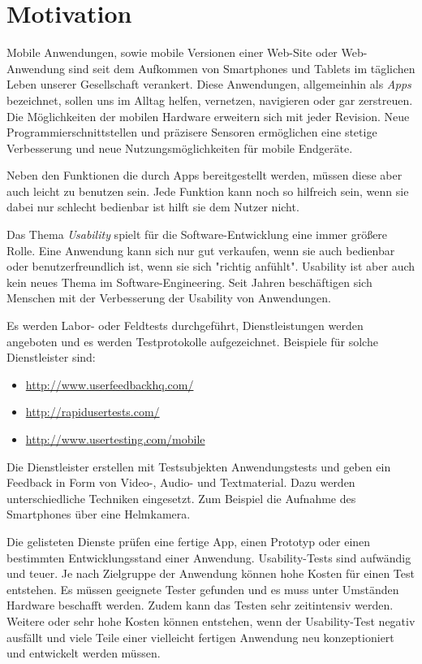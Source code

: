 \section{Motivation}
\label{motivation}

Mobile Anwendungen, sowie mobile Versionen einer Web-Site oder Web-Anwendung sind seit dem Aufkommen von Smartphones und Tablets im täglichen Leben unserer Gesellschaft verankert. Diese Anwendungen, allgemeinhin als \textit{Apps} bezeichnet, sollen uns im Alltag helfen, vernetzen, navigieren oder gar zerstreuen. Die Möglichkeiten der mobilen Hardware erweitern sich mit jeder Revision. Neue Programmierschnittstellen und präzisere Sensoren ermöglichen eine stetige Verbesserung und neue Nutzungsmöglichkeiten für mobile Endgeräte. 

Neben den Funktionen die durch Apps bereitgestellt werden, müssen diese aber auch leicht zu benutzen sein. Jede Funktion kann noch so hilfreich sein, wenn sie dabei nur schlecht bedienbar ist hilft sie dem Nutzer nicht.

Das Thema \textit{Usability} spielt für die Software-Entwicklung eine immer größere Rolle. Eine Anwendung kann sich nur gut verkaufen, wenn sie auch bedienbar oder benutzerfreundlich ist, wenn sie sich "richtig anfühlt". Usability ist aber auch kein neues Thema im Software-Engineering. Seit Jahren beschäftigen sich Menschen mit der Verbesserung der Usability von Anwendungen.

Es werden Labor- oder Feldtests durchgeführt, Dienstleistungen werden angeboten und es werden Testprotokolle aufgezeichnet. Beispiele für solche Dienstleister sind: 

\begin{itemize}
    \item{\url{http://www.userfeedbackhq.com/}}
    \item{\url{http://rapidusertests.com/}}
    \item{\url{http://www.usertesting.com/mobile}}
\end{itemize}

Die Dienstleister erstellen mit Testsubjekten Anwendungstests und geben ein Feedback in Form von Video-, Audio- und Textmaterial. Dazu werden unterschiedliche Techniken eingesetzt. Zum Beispiel die Aufnahme des Smartphones über eine Helmkamera. 

Die gelisteten Dienste prüfen eine fertige App, einen Prototyp oder einen bestimmten Entwicklungsstand einer Anwendung. Usability-Tests sind aufwändig und teuer. Je nach Zielgruppe der Anwendung können hohe Kosten für einen Test entstehen. Es müssen geeignete Tester gefunden und es muss unter Umständen Hardware beschafft werden. Zudem kann das Testen sehr zeitintensiv werden. Weitere oder sehr hohe Kosten können entstehen, wenn der Usability-Test negativ ausfällt und viele Teile einer vielleicht fertigen Anwendung neu konzeptioniert und entwickelt werden müssen. 

